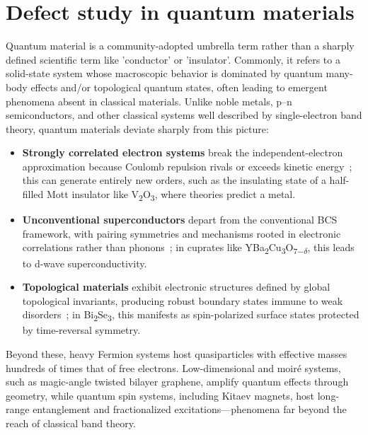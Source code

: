 \section{Defect study in quantum materials}
Quantum material is a community-adopted umbrella term rather than a sharply defined scientific term like 'conductor' or 'insulator'. Commonly, it refers to a solid-state system whose macroscopic behavior is dominated by quantum many-body effects and/or topological quantum states, often leading to emergent phenomena absent in classical materials. Unlike noble metals, p–n semiconductors, and other classical systems well described by single-electron band theory, quantum materials deviate sharply from this picture:
\begin{itemize}
	\item \textbf{Strongly correlated electron systems} break the independent-electron approximation because Coulomb repulsion rivals or exceeds kinetic energy~\cite{hubbardElectronCorrelationsNarrow1963}; this can generate entirely new orders, such as the insulating state of a half-filled Mott insulator like V\textsubscript{2}O\textsubscript{3}, where theories predict a metal\cite{mcwhanMottTransitionCrDoped1969,mottMetalInsulatorTransition1968,mottMetalInsulatorTransitions1990}.
	\item \textbf{Unconventional superconductors} depart from the conventional BCS framework, with pairing symmetries and mechanisms rooted in electronic correlations rather than phonons~\cite{OutShadowBCS2006}; in cuprates like 
	YBa\textsubscript{2}Cu\textsubscript{3}O\textsubscript{7$-\delta$}, this leads to d-wave superconductivity\cite{tsueiPairingSymmetryFlux1994,hardyPrecisionMeasurementsTemperature1993,kirtleySymmetryOrderParameter1995}.
	\item \textbf{Topological materials} exhibit electronic structures defined by global topological invariants, producing robust boundary states immune to weak disorders~\cite{chiuClassificationTopologicalQuantum2016}; in Bi\textsubscript{2}Se\textsubscript{3}, this manifests as spin-polarized surface states protected by time-reversal symmetry\cite{panElectronicStructureTopological2011,jozwiakSpinpolarizedSurfaceResonances2016,sobotaUltrafastElectronDynamics2014}.
\end{itemize}
Beyond these, heavy Fermion systems host quasiparticles with effective masses hundreds of times that of free electrons\cite{wirthExploringHeavyFermions2016,stewartHeavyfermionSystems1984}. Low-dimensional and moiré systems, such as magic-angle twisted bilayer graphene, amplify quantum effects through geometry\cite{caoUnconventionalSuperconductivityMagicangle2018,carrTwistronicsManipulatingElectronic2017}, while quantum spin systems, including Kitaev magnets, host long-range entanglement and fractionalized excitations\cite{normanHerbertsmithiteSearchQuantum2016,banejeeNeutronScatteringProximate2017}—phenomena far beyond the reach of classical band theory.  

